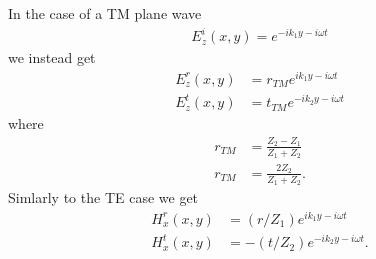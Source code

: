 In the case of a TM plane wave
\begin{align*}
  E_z^i(x, y) = e^{-ik_1y - i\omega t}
\end{align*}
we instead get
\begin{align*}
  E_z^r(x, y) &= r_{TM} e^{ik_1y - i\omega t} \\
  E_z^t(x, y) &= t_{TM} e^{-ik_2y - i\omega t}
\end{align*}
where
\begin{align*}
  r_{TM} &= \frac{Z_2 - Z_1}{Z_1 + Z_2} \\
  r_{TM} &= \frac{2Z_2}{Z_1 + Z_2}.
\end{align*}
Simlarly to the TE case we get
\begin{align*}
  H_x^r(x, y) &= (r/Z_1)e^{ik_1y - i\omega t} \\
  H_x^t(x, y) &= -(t/Z_2)e^{-ik_2y - i\omega t}.
\end{align*}